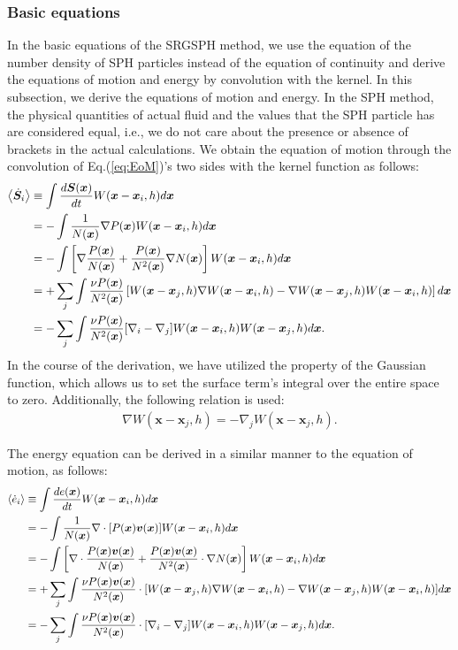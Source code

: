 \documentclass[]{aastex631}
\begin{document}
\subsubsection{Basic equations}
In the basic equations of the SRGSPH method, we use the equation of the number density of SPH particles instead of the equation of continuity and derive the equations of motion and energy by convolution with the kernel. In this subsection, we derive the equations of motion and energy. In the SPH method, the physical quantities of actual fluid and the values that the SPH particle has are considered equal, i.e., we do not care about the presence or absence of brackets in the actual calculations.
We obtain the equation of motion through the convolution of Eq.(\ref{eq:EoM})'s two sides with the kernel function as follows:
\begin{align}
  \ev{\dot{\bm{S}}_i}&\equiv  \int  \frac{d\bm{S}(\bm{x})}{dt}W(\bm{x}-\bm{x}_i,h)d\bm{x}\\
  &=-\int \frac{1}{N(\bm{x})}\nabla P(\bm{x}) W(\bm{x}-\bm{x}_i,h)d\bm{x}\\
  &=-\int\left[ \nabla\frac{P(\bm{x})}{N(\bm{x})} + \frac{P(\bm{x})}{N^2(\bm{x})}\nabla N(\bm{x}) \right] W(\bm{x}-\bm{x}_i,h)d\bm{x}\\
  &=+\sum_j\int \frac{\nu P(\bm{x})}{N^2(\bm{x})} \left[W(\bm{x}-\bm{x}_j,h) \nabla W(\bm{x}-\bm{x}_i,h) - \nabla W(\bm{x}-\bm{x}_j,h) W(\bm{x}-\bm{x}_i,h) \right] d\bm{x}\\
  &=-\sum_j\int \frac{\nu P(\bm{x})}{N^2(\bm{x})} [\nabla_i - \nabla_j] W(\bm{x}-\bm{x}_i,h) W(\bm{x}-\bm{x}_j,h) d\bm{x}.
\end{align}
In the course of the derivation, we have utilized the property of the Gaussian function, which allows us to set the surface term’s integral over the entire space to zero.
Additionally, the following relation is used:
\begin{align}
    \nabla W(\bm{x}-\bm{x}_j,h) = -\nabla_j W(\bm{x}-\bm{x}_j,h).
\end{align}

The energy equation can be derived in a similar manner to the equation of motion, as follows:
\begin{align}
  \ev{\dot{e}_i}
  &\equiv  \int \frac{de(\bm{x})}{dt}W(\bm{x}-\bm{x}_i,h)d\bm{x}\\
  &=-\int \frac{1}{N(\bm{x})}\nabla \cdot [P(\bm{x})\bm{v}(\bm{x})] W(\bm{x}-\bm{x}_i,h)d\bm{x}\\
  &=-\int \left[ \nabla \cdot \frac{P(\bm{x})\bm{v}(\bm{x})}{N(\bm{x})} + \frac{P(\bm{x})\bm{v}(\bm{x})}{N^2(\bm{x})}\cdot \nabla N(\bm{x}) \right]W(\bm{x}-\bm{x}_i,h)d\bm{x}\\  
  &=+ \sum_j \int \frac{\nu P(\bm{x})\bm{v}(\bm{x})}{N^2(\bm{x})} \cdot [W(\bm{x}-\bm{x}_j,h) \nabla W(\bm{x}-\bm{x}_i,h) - \nabla W(\bm{x}-\bm{x}_j,h) W(\bm{x}-\bm{x}_i,h)] d\bm{x}\\   
  &=- \sum_j \int \frac{\nu P(\bm{x})\bm{v}(\bm{x})}{N^2(\bm{x})} \cdot [\nabla_i - \nabla_j] W(\bm{x}-\bm{x}_i,h) W(\bm{x}-\bm{x}_j,h) d\bm{x}.
\end{align}
\end{document}
